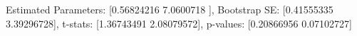Estimated Parameters: [0.56824216 7.0600718 ], Bootstrap SE: [0.41555335 3.39296728], t-stats: [1.36743491 2.08079572], p-values: [0.20866956 0.07102727]